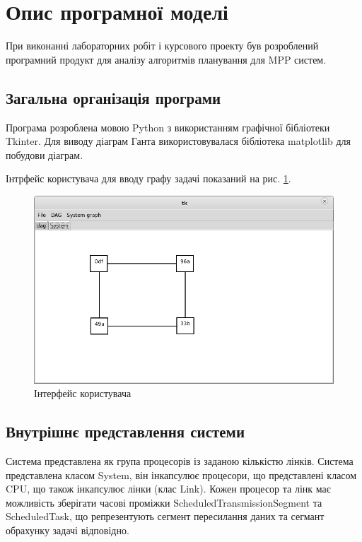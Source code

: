 \section{Опис програмної моделі}

При виконанні лабораторних робіт і курсового проекту був розроблений програмний продукт для аналізу алгоритмів планування для MPP систем.

\subsection{Загальна організація програми}
    Програма розроблена мовою Python з використанням графічної бібліотеки Tkinter. Для виводу діаграм Ганта використовувалася бібліотека matplotlib для побудови діаграм.

    Інтрфейс користувача для вводу графу задачі показаний на рис. \ref{fig:gui}.
    \begin{figure}[h!]
      \begin{center}
        \includegraphics[width=\textwidth]{res/system_graph.png}
      \end{center}
      \caption{Інтерфейс користувача}
    \label{fig:gui}
    \end{figure}

\subsection{Внутрішнє представлення системи}
    Система представлена як група процесорів із заданою кількістю лінків. Система представлена класом System, він інкапсулює процесори, що представлені класом CPU, що також інкапсулює лінки (клас Link). Кожен процесор та лінк має можливість зберігати часові проміжки ScheduledTransmissionSegment та ScheduledTask, що репрезентують сегмент пересилання даних та сегмант обрахунку задачі відповідно.

